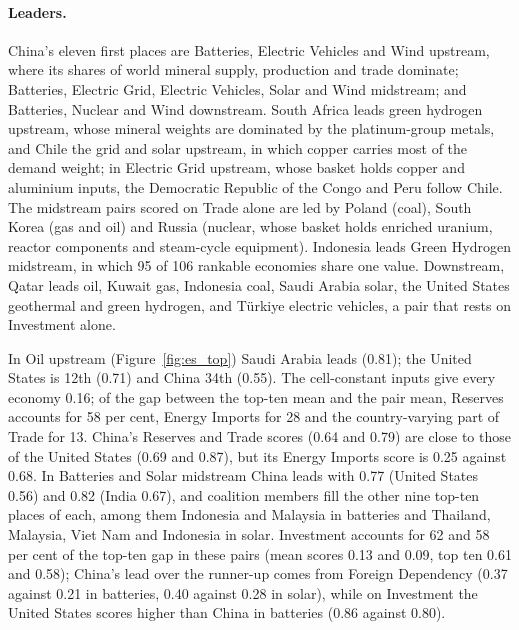 \paragraph{Leaders.} China's eleven first places are Batteries, Electric Vehicles and Wind upstream,
where its shares of world mineral supply, production and trade dominate; Batteries, Electric Grid,
Electric Vehicles, Solar and Wind midstream; and Batteries, Nuclear and Wind downstream. South
Africa leads green hydrogen upstream, whose mineral weights are dominated by the platinum-group
metals, and Chile the grid and solar upstream, in which copper carries most of the demand weight;
in Electric Grid upstream, whose basket holds copper and aluminium inputs, the Democratic Republic
of the Congo and Peru follow Chile. The midstream pairs scored on Trade alone are led by Poland
(coal), South Korea (gas and oil) and Russia (nuclear, whose basket holds enriched uranium, reactor
components and steam-cycle equipment). Indonesia leads Green Hydrogen midstream, in which 95 of
106 rankable economies share one value. Downstream, Qatar leads oil, Kuwait gas, Indonesia coal,
Saudi Arabia solar, the United States geothermal and green hydrogen, and T\"urkiye electric
vehicles, a pair that rests on Investment alone.

In Oil upstream (Figure~\ref{fig:es_top}) Saudi Arabia leads (0.81); the United States is 12th
(0.71) and China 34th (0.55). The cell-constant inputs give every economy 0.16; of the gap between
the top-ten mean and the pair mean, Reserves accounts for 58 per cent, Energy Imports for 28 and
the country-varying part of Trade for 13. China's Reserves and Trade scores (0.64 and 0.79) are
close to those of the United States (0.69 and 0.87), but its Energy Imports score is 0.25 against
0.68. In Batteries and Solar midstream China leads with 0.77 (United States 0.56) and 0.82 (India
0.67), and coalition members fill the other nine top-ten places of each, among them Indonesia and
Malaysia in batteries and Thailand, Malaysia, Viet Nam and Indonesia in solar. Investment accounts
for 62 and 58 per cent of the top-ten gap in these pairs (mean scores 0.13 and 0.09, top ten 0.61
and 0.58); China's lead over the runner-up comes from Foreign Dependency (0.37 against 0.21 in
batteries, 0.40 against 0.28 in solar), while on Investment the United States scores higher than
China in batteries (0.86 against 0.80).

